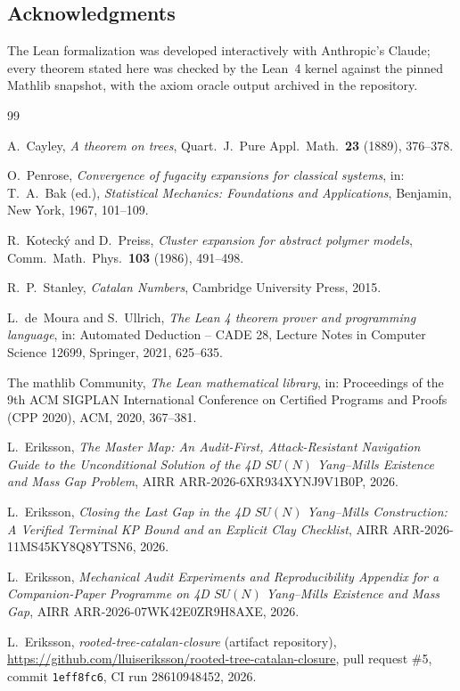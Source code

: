 \documentclass[11pt]{article}
\theoremstyle{remark}
\theoremstyle{definition}
\begin{document}
\subsection*{Acknowledgments}
The Lean formalization was developed interactively with Anthropic's Claude;
every theorem stated here was checked by the Lean~4 kernel against the pinned
Mathlib snapshot, with the axiom oracle output archived in the repository.

\begin{thebibliography}{99}

A.~Cayley,
\emph{A theorem on trees},
Quart.\ J.\ Pure Appl.\ Math.\ \textbf{23} (1889), 376--378.

O.~Penrose,
\emph{Convergence of fugacity expansions for classical systems},
in: T.~A.~Bak (ed.), \emph{Statistical Mechanics: Foundations and
Applications}, Benjamin, New York, 1967, 101--109.

R.~Koteck\'y and D.~Preiss,
\emph{Cluster expansion for abstract polymer models},
Comm.\ Math.\ Phys.\ \textbf{103} (1986), 491--498.

R.~P.~Stanley,
\emph{Catalan Numbers},
Cambridge University Press, 2015.

L.~de~Moura and S.~Ullrich,
\emph{The Lean 4 theorem prover and programming language},
in: Automated Deduction -- CADE 28, Lecture Notes in Computer Science
12699, Springer, 2021, 625--635.

The mathlib Community,
\emph{The Lean mathematical library},
in: Proceedings of the 9th ACM SIGPLAN International Conference on Certified
Programs and Proofs (CPP 2020), ACM, 2020, 367--381.

L.~Eriksson,
\emph{The Master Map: An Audit-First, Attack-Resistant Navigation Guide to the
Unconditional Solution of the 4D $SU(N)$ Yang--Mills Existence and Mass Gap
Problem},
AIRR ARR-2026-6XR934XYNJ9V1B0P, 2026.

L.~Eriksson,
\emph{Closing the Last Gap in the 4D $SU(N)$ Yang--Mills Construction: A
Verified Terminal KP Bound and an Explicit Clay Checklist},
AIRR ARR-2026-11MS45KY8Q8YTSN6, 2026.

L.~Eriksson,
\emph{Mechanical Audit Experiments and Reproducibility Appendix for a
Companion-Paper Programme on 4D $SU(N)$ Yang--Mills Existence and Mass Gap},
AIRR ARR-2026-07WK42E0ZR9H8AXE, 2026.

L.~Eriksson,
\emph{rooted-tree-catalan-closure} (artifact repository),
\url{https://github.com/lluiseriksson/rooted-tree-catalan-closure},
pull request \#5, commit \texttt{1eff8fc6}, CI run 28610948452, 2026.

\end{thebibliography}
\end{document}
